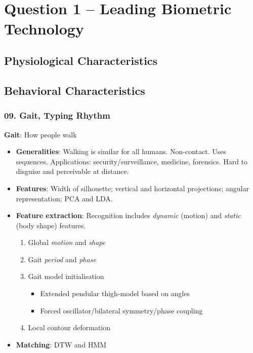 \documentclass[a4paper]{article}
\title{\vspace{-.25cm} \HWTitle \\ \vspace{.25cm}}
\author{\HWAuthorName}
\begin{document}
\maketitle

\section*{Question 1 -- Leading Biometric Technology} %
\label{sec:question_1}
  \subsection*{Physiological Characteristics}
    
    
  \subsection*{Behavioral Characteristics}
    
    \subsubsection*{09. Gait, Typing Rhythm}
      \textbf{Gait}: How people walk
      \begin{itemize}
        \item \textbf{Generalities}: Walking is similar for all humans. Non-contact. Uses sequences. Applications: security/surveillance, medicine, forensics. Hard to disguise and perceivable at distance.
        \item \textbf{Features}: Width of silhouette; vertical and horizontal projections; angular representation; PCA and LDA.
        \item \textbf{Feature extraction}: Recognition includes \emph{dynamic} (motion) and \emph{static} (body shape) features.
        \begin{enumerate}
          \item Global \emph{motion} and \emph{shape}
          \item Gait \emph{period} and \emph{phase}
          \item Gait model initialisation
          \begin{itemize}
            \item Extended pendular thigh-model based on angles
            \item Forced oscillator/bilateral symmetry/phase coupling
          \end{itemize}
          \item Local contour deformation
        \end{enumerate}
        \item \textbf{Matching}: DTW and HMM
      \end{itemize}
\end{document}
